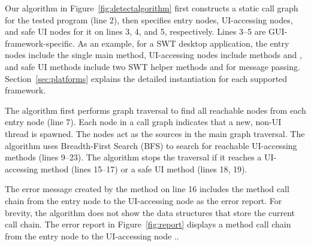 Our algorithm in Figure~\ref{fig:detectalgorithm} %
first constructs a static call graph for the tested program (line 2),
then specifies entry nodes, UI-accessing nodes, and safe UI nodes
for it on lines 3, 4, and 5, respectively. Lines 3--5 are GUI-framework-specific.
As an example, for a SWT desktop application, the entry nodes include
the single main method, UI-accessing nodes include methods
 and ,
and safe UI methods include two SWT helper methods   and
 for message passing. Section~\ref{sec:platforms}
explains the detailed instantiation for each supported framework.

The algorithm first performs graph traversal to find
all reachable 
nodes from each entry node (line 7).
Each  node in a call graph indicates that a new,
non-UI thread is spawned.  The 
nodes act as the sources in the main graph traversal.
The algorithm uses Breadth-First Search (BFS) to search for reachable UI-accessing
methods (lines 9--23).
The algorithm stops the traversal if it reaches a UI-accessing
method (lines 15--17) or a safe UI method (lines 18, 19).

The error message created by the method  on line 16
includes the method call chain from the entry node to the UI-accessing node
as the error report. For brevity, the algorithm does not show the data structures that store
the current call chain.
The error report in Figure~\ref{fig:report} displays a method call chain from the entry
node  to the UI-accessing node ..



